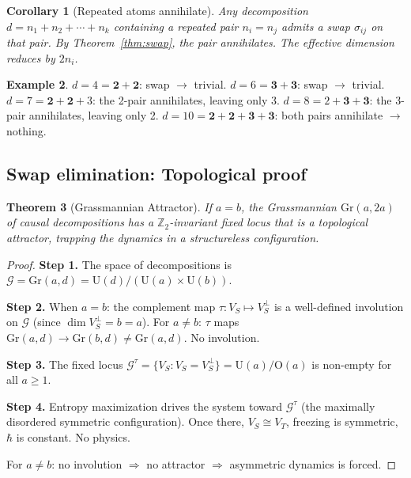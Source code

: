 \documentclass[12pt]{article}
\newtheorem{theorem}{Theorem}[section]
\newtheorem{corollary}[theorem]{Corollary}
\theoremstyle{remark}
\theoremstyle{definition}
\newtheorem{example}[theorem]{Example}
\begin{document}
\begin{corollary}[Repeated atoms annihilate]
\label{cor:annihilate}
Any decomposition $d = n_1 + n_2 + \cdots + n_k$ containing a repeated pair $n_i = n_j$ admits a swap $\sigma_{ij}$ on that pair. By Theorem~\ref{thm:swap}, the pair annihilates. The effective dimension reduces by $2n_i$.
\end{corollary}

\begin{example}
$d = 4 = \mathbf{2+2}$: swap $\to$ trivial. \;
$d = 6 = \mathbf{3+3}$: swap $\to$ trivial. \;
$d = 7 = \mathbf{2+2}+3$: the 2-pair annihilates, leaving only 3. \;
$d = 8 = 2+\mathbf{3+3}$: the 3-pair annihilates, leaving only 2. \;
$d = 10 = \mathbf{2+2}+\mathbf{3+3}$: both pairs annihilate $\to$ nothing.
\end{example}

\subsection{Swap elimination: Topological proof}

\begin{theorem}[Grassmannian Attractor]
\label{thm:grassmann}
If $a = b$, the Grassmannian $\text{Gr}(a, 2a)$ of causal decompositions has a $\mathbb{Z}_2$-invariant fixed locus that is a topological attractor, trapping the dynamics in a structureless configuration.
\end{theorem}

\begin{proof}
\textbf{Step 1.}
The space of decompositions is $\mathcal{G} = \text{Gr}(a, d) = \text{U}(d)/(\text{U}(a) \times \text{U}(b))$.

\textbf{Step 2.}
When $a = b$: the complement map $\tau: V_S \mapsto V_S^\perp$ is a well-defined involution on $\mathcal{G}$ (since $\dim V_S^\perp = b = a$). For $a \neq b$: $\tau$ maps $\text{Gr}(a, d) \to \text{Gr}(b, d) \neq \text{Gr}(a, d)$. No involution.

\textbf{Step 3.}
The fixed locus $\mathcal{G}^\tau = \{V_S : V_S = V_S^\perp\} = \text{U}(a)/\text{O}(a)$ is non-empty for all $a \geq 1$.

\textbf{Step 4.}
Entropy maximization drives the system toward $\mathcal{G}^\tau$ (the maximally disordered symmetric configuration). Once there, $V_S \cong V_T$, freezing is symmetric, $\hbar$ is constant. No physics.

For $a \neq b$: no involution $\Rightarrow$ no attractor $\Rightarrow$ asymmetric dynamics is forced.
\end{proof}
\end{document}

